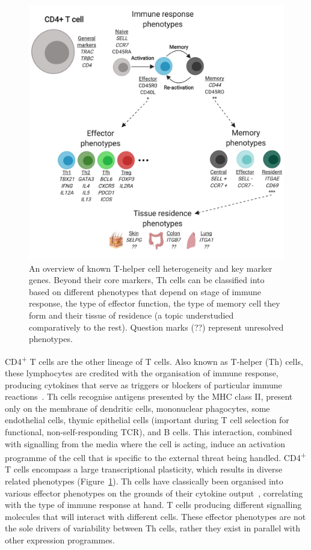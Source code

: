 \begin{figure}[ht!]
    \centering    
    \includegraphics[width=1.0\textwidth]{Chapter1/Figs/chap1_fig3.png} %
    \caption[T-helper cell heterogeneity and key marker genes]{An overview of known T-helper cell heterogeneity and key marker genes. Beyond their core markers, Th cells can be classified into based on different phenotypes that depend on stage of immune response, the type of effector function, the type of memory cell they form and their tissue of residence (a topic understudied comparatively to the rest). Question marks (??) represent unresolved phenotypes.}
    \label{fig:chap1_fig3}
\end{figure}

CD4\textsuperscript{+} T cells are the other lineage of T cells. Also known as T-helper (Th) cells, these lymphocytes are credited with the organisation of immune response, producing cytokines that serve as triggers or blockers of particular immune reactions~\citep{luckheeram_cd4+t_2012}. Th cells recognise antigens presented by the MHC class II, present only on the membrane of dendritic cells, mononuclear phagocytes, some endothelial cells, thymic epithelial cells (important during T cell selection for functional, non-self-responding TCR), and B cells. This interaction, combined with signalling from the media where the cell is acting, induce an activation programme of the cell that is specific to the external threat being handled. CD4\textsuperscript{+} T cells encompass a large transcriptional plasticity, which results in diverse related phenotypes (Figure~\ref{fig:chap1_fig3}). Th cells have classically been organised into various effector phenotypes on the grounds of their cytokine output~\citep{mosmann_two_1986,schmitt_regulation_2015}, correlating with the type of immune response at hand. T cells producing different signalling molecules that will interact with different cells. These effector phenotypes are not the sole drivers of variability between Th cells, rather they exist in parallel with other expression programmes. 

